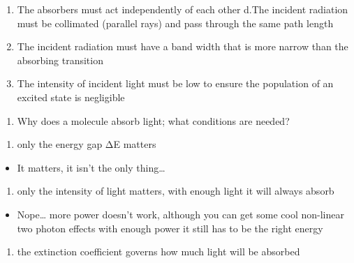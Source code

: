 \documentclass[
]{book}
\providecommand{\tightlist}{%
  \setlength{\itemsep}{0pt}\setlength{\parskip}{0pt}}
\begin{document}
\begin{enumerate}
\def\labelenumi{\alph{enumi}.}
\setcounter{enumi}{2}
\tightlist
\item
  The absorbers must act independently of each other
  d.The incident radiation must be collimated (parallel rays) and pass through the same path length
\item
  The incident radiation must have a band width that is more narrow than the absorbing transition
\item
  The intensity of incident light must be low to ensure the population of an excited state is negligible
\end{enumerate}

\begin{enumerate}
\def\labelenumi{\arabic{enumi}.}
\setcounter{enumi}{2}
\tightlist
\item
  Why does a molecule absorb light; what conditions are needed?
\end{enumerate}

\begin{enumerate}
\def\labelenumi{\alph{enumi}.}
\tightlist
\item
  only the energy gap ΔE matters
\end{enumerate}

\begin{itemize}
\tightlist
\item
  It matters, it isn't the only thing\ldots{}
\end{itemize}

\begin{enumerate}
\def\labelenumi{\alph{enumi}.}
\setcounter{enumi}{1}
\tightlist
\item
  only the intensity of light matters, with enough light it will always absorb
\end{enumerate}

\begin{itemize}
\tightlist
\item
  Nope\ldots{} more power doesn't work, although you can get some cool non-linear two photon effects with enough power it still has to be the right energy
\end{itemize}

\begin{enumerate}
\def\labelenumi{\alph{enumi}.}
\setcounter{enumi}{2}
\tightlist
\item
  the extinction coefficient governs how much light will be absorbed
\end{enumerate}
\end{document}
